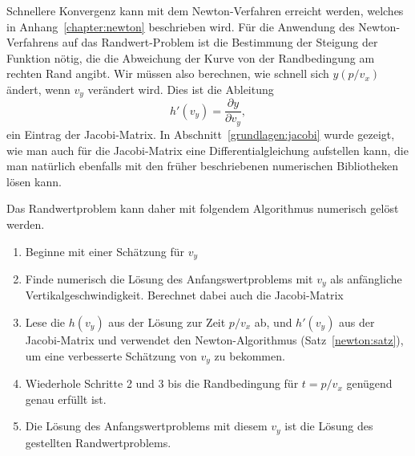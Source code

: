 Schnellere Konvergenz kann mit dem Newton-Verfahren erreicht werden,
welches in Anhang~\ref{chapter:newton} beschrieben wird.
%
Für die Anwendung des Newton-Verfahrens auf das Randwert-Problem
ist die Bestimmung der Steigung der Funktion nötig, die die Abweichung
der Kurve von der Randbedingung am rechten Rand angibt.
Wir müssen also berechnen, wie schnell sich $y(p/v_x)$ ändert,
wenn $v_y$ verändert wird.
Dies ist die Ableitung
\[
h'(v_y)= \frac{\partial y}{\partial v_y},
\]
ein Eintrag der Jacobi-Matrix.
In Abschnitt~\ref{grundlagen:jacobi} wurde gezeigt, wie man auch für
die Jacobi-Matrix eine Differentialgleichung aufstellen kann, die
man natürlich ebenfalls mit den früher beschriebenen numerischen
Bibliotheken lösen kann.

Das Randwertproblem kann daher mit folgendem Algorithmus numerisch gelöst
werden.
\begin{enumerate}
\item Beginne mit einer Schätzung für $v_y$
\item Finde numerisch die Lösung des Anfangswertproblems mit $v_y$
als anfängliche Vertikalgeschwindigkeit.
Berechnet dabei auch die Jacobi-Matrix
\item Lese die $h(v_y)$ aus der Lösung zur Zeit $p/v_x$ ab, und $h'(v_y)$
aus der Jacobi-Matrix und verwendet den Newton-Algorithmus
(Satz~\ref{newton:satz}), um eine verbesserte Schätzung von $v_y$ 
zu bekommen.
\item Wiederhole Schritte 2 und 3 bis die Randbedingung für $t=p/v_x$
genügend genau erfüllt ist.
\item Die Lösung des Anfangswertproblems mit diesem $v_y$ ist die
Lösung des gestellten Randwertproblems.
\end{enumerate}

